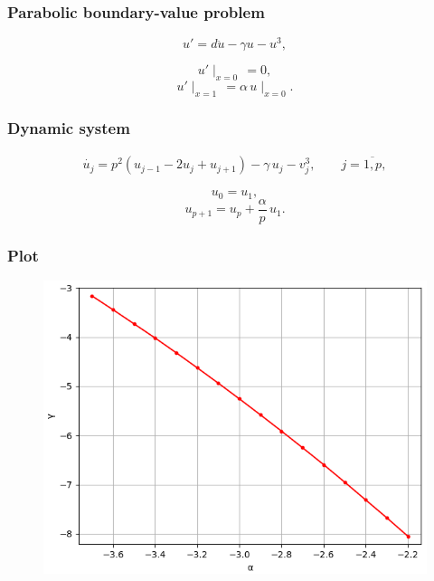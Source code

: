 \documentclass[fullscreen=true, unicode, bookmarks=false]{beamer}
\begin{document}
\begin{frame}
\frametitle{ Parabolic boundary-value problem } 

$$ u' = d \ddot{u} - \gamma u - u^3, $$

\bigskip

$$  u'\mid_{x=0} \, = 0, $$
$$ u'\mid_{x=1} \, = \alpha\,u\mid_{x=0}. $$

\end{frame}

\begin{frame}
\frametitle{ Dynamic system } 

\begin{eqnarray}\label{u_system} 
	\dot{u_j} = p^2(u_{j-1}-2u_j+u_{j+1}) - \gamma\,u_j - v_j^3, \qquad j=\overline{1,p},
\end{eqnarray}	

\bigskip

$$ u_0 = u_1, $$
$$ u_{p+1} = u_p + \frac{\alpha}{p}\,u_1. $$

\end{frame}

\begin{frame}
\frametitle{ Plot } 

\begin{figure}
\includegraphics[scale=0.65]{Critical_relation.png}
\end{figure}

\end{frame}
\end{document}
